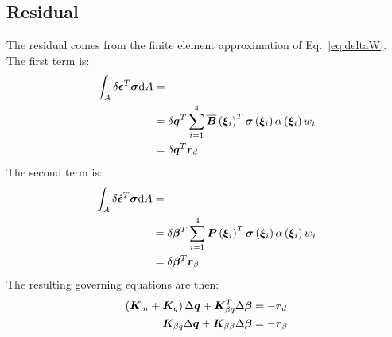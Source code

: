 \subsection{Residual}
The residual comes from the finite element approximation of Eq.~\ref{eq:deltaW}. \\
The first term is:
\begin{equation}
\begin{split}
\int_A \delta{\bm{\epsilon}}^T \bm{\sigma} \text{d}A & = \\
& = \delta \bm{q}^T \sum_{i=1}^{4} \overline{\bm{B}}\left(  \bm{ \xi }_{ i }  \right)^T  \bm{\sigma}\left(  \bm{ \xi }_{ i }  \right)  \alpha \left(  \bm{ \xi }_{ i }  \right)  w_i \\
& = \delta \bm{q}^T \bm{r}_{d}
\end{split}
\end{equation}
The second term is:
\begin{equation}
\begin{split}
\int_A \delta \hat{\bm{\epsilon}}^T \bm{\sigma} \text{d}A & = \\
& = \delta \bm{\beta}^T \sum_{i=1}^{4} \bm{P}\left(  \bm{ \xi }_{ i }  \right)^T  \bm{\sigma}\left(  \bm{ \xi }_{ i }  \right)  \alpha \left(  \bm{ \xi }_{ i }  \right)  w_i \\
& = \delta \bm{\beta}^T \bm{r}_{\beta}
\end{split}
\end{equation}
The resulting governing equations are then:
\begin{subequations}
\begin{align}
\left(  \bm{K}_m + \bm{K}_g  \right) \Delta \bm{q} + \bm{K}_{\beta q} ^ T \Delta \bm{\beta} & = - \bm{r}_{d} \\
\bm{K}_{\beta q}  \Delta \bm{q} + \bm{K}_{\beta \beta}  \Delta \bm{\beta} & = - \bm{r}_{\beta}
\end{align}
\end{subequations}
